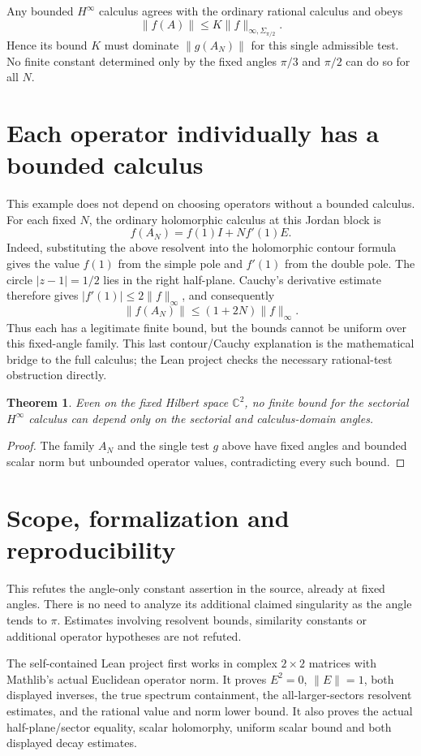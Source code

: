 \documentclass[11pt]{article}
\newtheorem{theorem}{Theorem}
\begin{document}
Any bounded $H^\infty$ calculus agrees with the ordinary
rational calculus and obeys
\[
       \|f(A)\|\leq K\|f\|_{\infty,\Sigma_{\pi/2}}.
\]
Hence its bound $K$ must dominate $\|g(A_N)\|$ for
this single admissible test. No finite constant
determined only by the fixed angles $\pi/3$ and
$\pi/2$ can do so for all $N$.

\section*{Each operator individually has a bounded calculus}
This example does not depend on choosing operators
without a bounded calculus. For each fixed $N$, the
ordinary holomorphic calculus at this Jordan block is
\[
                 f(A_N)=f(1)I+Nf'(1)E.
\]
Indeed, substituting the above resolvent into the
holomorphic contour formula gives the value $f(1)$
from the simple pole and $f'(1)$ from the double pole.
The circle $|z-1|=1/2$ lies in the right half-plane.
Cauchy's derivative estimate therefore gives
$|f'(1)|\leq2\|f\|_\infty$, and consequently
\[
                  \|f(A_N)\|\leq(1+2N)\|f\|_\infty.
\]
Thus each has a legitimate finite bound, but the bounds
cannot be uniform over this fixed-angle family.
This last contour/Cauchy explanation is the mathematical
bridge to the full calculus; the Lean project checks
the necessary rational-test obstruction directly.

\begin{theorem}
Even on the fixed Hilbert space $\mathbb C^2$, no finite
bound for the sectorial $H^\infty$ calculus can depend
only on the sectorial and calculus-domain angles.
\end{theorem}
\begin{proof}
The family $A_N$ and the single test $g$ above have
fixed angles and bounded scalar norm but unbounded
operator values, contradicting every such bound.
\end{proof}

\newpage
\section*{Scope, formalization and reproducibility}
This refutes the angle-only constant assertion in the
source, already at fixed angles. There is no need to
analyze its additional claimed singularity as the angle
tends to $\pi$. Estimates involving resolvent bounds,
similarity constants or additional operator hypotheses
are not refuted.

The self-contained Lean project first works in complex
$2\times2$ matrices with Mathlib's actual Euclidean
operator norm. It proves $E^2=0$, $\|E\|=1$, both
displayed inverses, the true spectrum containment,
the all-larger-sectors resolvent estimates, and the
rational value and norm lower bound. It also proves
the actual half-plane/sector equality, scalar holomorphy,
uniform scalar bound and both displayed decay estimates.
\end{document}
